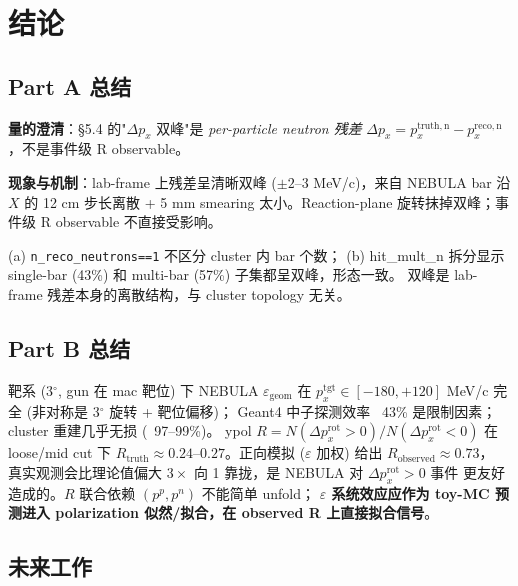 \documentclass[a4paper,11pt]{ctexart}
\begin{document}
\section{结论}

\subsection{Part A 总结}

\textbf{量的澄清}：\S5.4 的"$\Delta p_x$ 双峰"是 \emph{per-particle neutron 残差}
$\Delta p_x = p_x^{\mathrm{truth,n}} - p_x^{\mathrm{reco,n}}$，不是事件级 R observable。

\textbf{现象与机制}：lab-frame 上残差呈清晰双峰 ($\pm 2$--$3$ MeV/c)，来自 NEBULA bar 沿 $X$ 的 12 cm
步长离散 + 5 mm smearing 太小。Reaction-plane 旋转抹掉双峰；事件级 R observable 不直接受影响。

(a) \texttt{n\_reco\_neutrons==1} 不区分 cluster 内 bar 个数；
(b) hit\_mult\_n 拆分显示 single-bar (43\%) 和 multi-bar (57\%) 子集都呈双峰，形态一致。
双峰是 lab-frame 残差本身的离散结构，与 cluster topology 无关。

\subsection{Part B 总结}

靶系 (3$^\circ$, gun 在 mac 靶位) 下 NEBULA $\varepsilon_\mathrm{geom}$
在 $p_x^\mathrm{tgt} \in [-180, +120]$ MeV/c 完全 (非对称是 3$^\circ$ 旋转 + 靶位偏移)；
Geant4 中子探测效率 ~43\% 是限制因素；cluster 重建几乎无损 (~97--99\%)。
ypol $R = N(\Delta p_x^\mathrm{rot} > 0)/N(\Delta p_x^\mathrm{rot} < 0)$ 在 loose/mid cut 下
$R_\mathrm{truth} \approx 0.24$--$0.27$。正向模拟 ($\varepsilon$ 加权) 给出 $R_\mathrm{observed} \approx 0.73$，
真实观测会比理论值偏大 $3 \times$ 向 1 靠拢，是 NEBULA 对 $\Delta p_x^\mathrm{rot} > 0$ 事件
更友好造成的。$R$ 联合依赖 $(p^p, p^n)$ 不能简单 unfold；
\textbf{$\varepsilon$ 系统效应应作为 toy-MC 预测进入 polarization 似然/拟合，在 observed R 上直接拟合信号}。

\subsection{未来工作}
\end{document}
